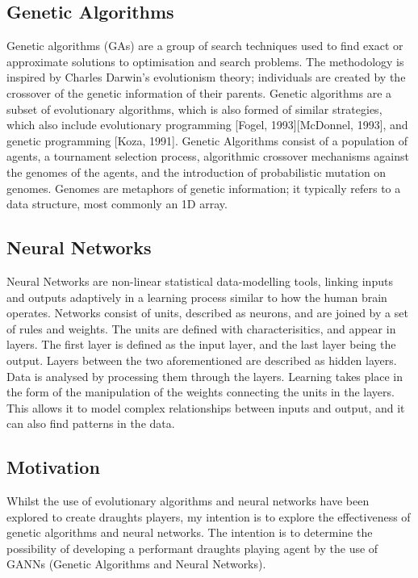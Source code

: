 \documentclass[12pt,a4paper]{article}
\begin{document}
\subsection*{Genetic Algorithms}

    Genetic algorithms (GAs) are a group of search techniques used to find exact or approximate solutions to optimisation and search problems. The methodology is inspired by Charles Darwin's evolutionism theory; individuals are created by the crossover of the genetic information of their parents. 
    Genetic algorithms are a subset of evolutionary algorithms, which is also formed of similar strategies, which also include evolutionary programming [Fogel, 1993][McDonnel, 1993], and genetic programming [Koza, 1991]. Genetic Algorithms consist of a population of agents, a tournament selection process, algorithmic crossover mechanisms against the genomes of the agents, and the introduction of probabilistic mutation on genomes. Genomes are metaphors of genetic information; it typically refers to a data structure, most commonly an 1D array.

\subsection*{Neural Networks}

    Neural Networks are non-linear statistical data-modelling tools, linking inputs and outputs adaptively in a learning process similar to how the human brain operates. Networks consist of units, described as neurons, and are joined by a set of rules and weights. The units are defined with characterisitics, and appear in layers. The first layer is defined as the input layer, and the last layer being the output. Layers between the two aforementioned are described as hidden layers. Data is analysed by processing them through the layers. Learning takes place in the form of the manipulation of the weights connecting the units in the layers. This allows it to model complex relationships between inputs and output, and it can also find patterns in the data. 

\subsection*{Motivation}
    Whilst the use of evolutionary algorithms and neural networks have been explored to create draughts players, my intention is to explore the effectiveness of genetic algorithms and neural networks. The intention is to determine the possibility of developing a performant draughts playing agent by the use of GANNs (Genetic Algorithms and Neural Networks).
\end{document}
